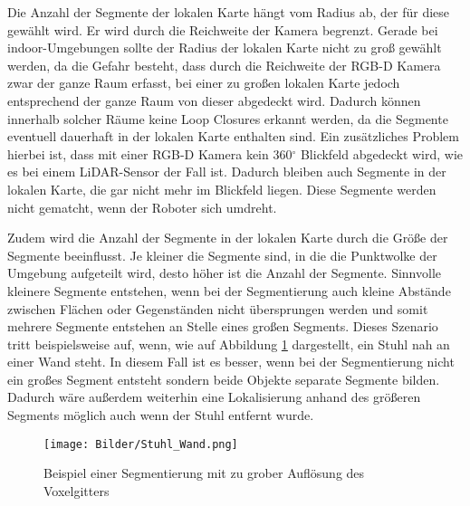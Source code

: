 Die Anzahl der Segmente der lokalen Karte hängt vom Radius ab, der für diese gewählt wird. Er wird durch die Reichweite der Kamera begrenzt. Gerade bei indoor-Umgebungen sollte der Radius der lokalen Karte nicht zu groß gewählt werden, da die Gefahr besteht, dass durch die Reichweite der RGB-D Kamera zwar der ganze Raum erfasst, bei einer zu großen lokalen Karte jedoch entsprechend der ganze Raum von dieser abgedeckt wird. Dadurch können innerhalb solcher Räume keine Loop Closures erkannt werden, da die Segmente eventuell dauerhaft in der lokalen Karte enthalten sind. Ein zusätzliches Problem hierbei ist, dass mit einer RGB-D Kamera kein 360$ ^\circ $ Blickfeld abgedeckt wird, wie es bei einem LiDAR-Sensor der Fall ist. Dadurch bleiben auch Segmente in der lokalen Karte, die gar nicht mehr im Blickfeld liegen. Diese Segmente  werden nicht gematcht, wenn der Roboter sich umdreht.

Zudem wird die Anzahl der Segmente in der lokalen Karte durch die Größe der Segmente beeinflusst. Je kleiner die Segmente sind, in die die Punktwolke der Umgebung aufgeteilt wird, desto höher ist die Anzahl der Segmente. Sinnvolle kleinere Segmente entstehen, wenn bei der Segmentierung auch kleine Abstände zwischen Flächen oder Gegenständen nicht übersprungen werden und somit mehrere Segmente entstehen an Stelle eines großen Segments. Dieses Szenario tritt beispielsweise auf, wenn, wie auf Abbildung \ref{fig:Übersprung} dargestellt, ein Stuhl nah an einer Wand steht. In diesem Fall ist es besser, wenn bei der Segmentierung nicht ein großes Segment entsteht sondern beide Objekte separate Segmente bilden. Dadurch wäre außerdem weiterhin eine Lokalisierung anhand des größeren Segments möglich auch wenn der Stuhl entfernt wurde. 

\begin{figure}
	\centering
	\texttt{[image: Bilder/Stuhl\_Wand.png]}
	\caption{Beispiel einer Segmentierung mit zu grober Auflösung des Voxelgitters}
	\label{fig:Übersprung}
\end{figure}


